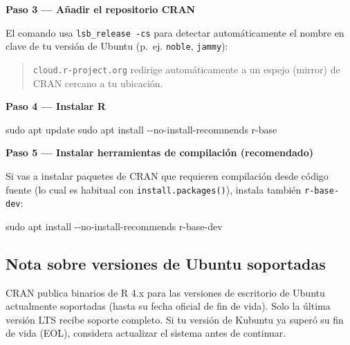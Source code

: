 \documentclass[
  man,
  floatsintext,
  longtable,
  a4paper,
  nolmodern,
  notxfonts,
  notimes,
  12pt,
  colorlinks=true,linkcolor=blue,citecolor=blue,urlcolor=blue]{apa7}
\newenvironment{Shaded}{\begin{snugshade}}{\end{snugshade}}
\newcommand{\AttributeTok}[1]{\textcolor[rgb]{0.40,0.45,0.13}{#1}}
\newcommand{\ExtensionTok}[1]{\textcolor[rgb]{0.00,0.23,0.31}{#1}}
\newcommand{\FunctionTok}[1]{\textcolor[rgb]{0.28,0.35,0.67}{#1}}
\newcommand{\NormalTok}[1]{\textcolor[rgb]{0.00,0.23,0.31}{#1}}
\newcommand{\StringTok}[1]{\textcolor[rgb]{0.13,0.47,0.30}{#1}}
\newcommand{\VariableTok}[1]{\textcolor[rgb]{0.07,0.07,0.07}{#1}}
\begin{document}
\textbf{Paso 3 --- Añadir el repositorio CRAN}

El comando usa \texttt{lsb\_release\ -cs} para detectar automáticamente
el nombre en clave de tu versión de Ubuntu (p.~ej. \texttt{noble},
\texttt{jammy}):

\begin{Shaded}
\end{Shaded}

\begin{quote}
\texttt{cloud.r-project.org} redirige automáticamente a un espejo
(mirror) de CRAN cercano a tu ubicación.
\end{quote}

\textbf{Paso 4 --- Instalar R}

\begin{Shaded}
\begin{Highlighting}[]
\FunctionTok{sudo}\NormalTok{ apt update}
\FunctionTok{sudo}\NormalTok{ apt install }\AttributeTok{{-}{-}no{-}install{-}recommends}\NormalTok{ r{-}base}
\end{Highlighting}
\end{Shaded}

\textbf{Paso 5 --- Instalar herramientas de compilación (recomendado)}

Si vas a instalar paquetes de CRAN que requieren compilación desde
código fuente (lo cual es habitual con \texttt{install.packages()}),
instala también \texttt{r-base-dev}:

\begin{Shaded}
\begin{Highlighting}[]
\FunctionTok{sudo}\NormalTok{ apt install }\AttributeTok{{-}{-}no{-}install{-}recommends}\NormalTok{ r{-}base{-}dev}
\end{Highlighting}
\end{Shaded}

\subsection{Nota sobre versiones de Ubuntu
soportadas}\label{nota-sobre-versiones-de-ubuntu-soportadas}

CRAN publica binarios de R 4.x para las versiones de escritorio de
Ubuntu actualmente soportadas (hasta su fecha oficial de fin de vida).
Solo la última versión LTS recibe soporte completo. Si tu versión de
Kubuntu ya superó su fin de vida (EOL), considera actualizar el sistema
antes de continuar.
\end{document}
